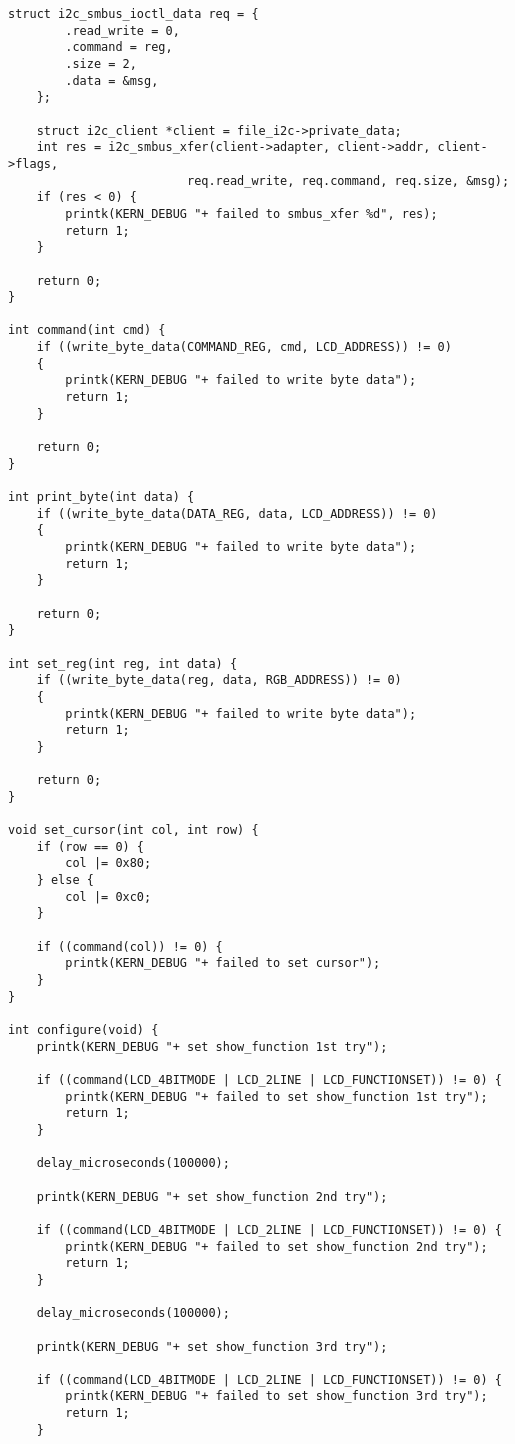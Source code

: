 \begin{appendices}
\begin{lstlisting}[label=driver,caption=Код модуля ядра~---~драйвера символьного дисплея]
    struct i2c_smbus_ioctl_data req = {
        .read_write = 0,
        .command = reg,
        .size = 2,
        .data = &msg,
    };

    struct i2c_client *client = file_i2c->private_data;
    int res = i2c_smbus_xfer(client->adapter, client->addr, client->flags,
                         req.read_write, req.command, req.size, &msg);
    if (res < 0) {
        printk(KERN_DEBUG "+ failed to smbus_xfer %d", res);
        return 1;
    }

    return 0;
}

int command(int cmd) {
    if ((write_byte_data(COMMAND_REG, cmd, LCD_ADDRESS)) != 0)
    {
        printk(KERN_DEBUG "+ failed to write byte data");
        return 1;
    }

    return 0;
}

int print_byte(int data) {
    if ((write_byte_data(DATA_REG, data, LCD_ADDRESS)) != 0)
    {
        printk(KERN_DEBUG "+ failed to write byte data");
        return 1;
    }

    return 0;
}

int set_reg(int reg, int data) {
    if ((write_byte_data(reg, data, RGB_ADDRESS)) != 0)
    {
        printk(KERN_DEBUG "+ failed to write byte data");
        return 1;
    }

    return 0;
}

void set_cursor(int col, int row) {
    if (row == 0) {
        col |= 0x80;
    } else {
        col |= 0xc0;
    }

    if ((command(col)) != 0) {
        printk(KERN_DEBUG "+ failed to set cursor");
    }
}

int configure(void) {
    printk(KERN_DEBUG "+ set show_function 1st try");

    if ((command(LCD_4BITMODE | LCD_2LINE | LCD_FUNCTIONSET)) != 0) {
        printk(KERN_DEBUG "+ failed to set show_function 1st try");
        return 1;
    }

    delay_microseconds(100000);

    printk(KERN_DEBUG "+ set show_function 2nd try");

    if ((command(LCD_4BITMODE | LCD_2LINE | LCD_FUNCTIONSET)) != 0) {
        printk(KERN_DEBUG "+ failed to set show_function 2nd try");
        return 1;
    }

    delay_microseconds(100000);

    printk(KERN_DEBUG "+ set show_function 3rd try");

    if ((command(LCD_4BITMODE | LCD_2LINE | LCD_FUNCTIONSET)) != 0) {
        printk(KERN_DEBUG "+ failed to set show_function 3rd try");
        return 1;
    }


\end{lstlisting}
\end{appendices}
